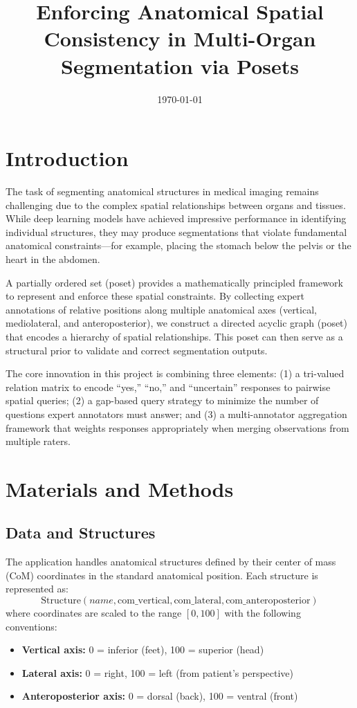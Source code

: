 \documentclass[12pt,a4paper]{article}
\title{Enforcing Anatomical Spatial Consistency in Multi-Organ Segmentation via Posets}
\author{}
\date{\today}
\begin{document}
\maketitle

\tableofcontents
\newpage

\section{Introduction}

The task of segmenting anatomical structures in medical imaging remains challenging due to the complex spatial relationships between organs and tissues. While deep learning models have achieved impressive performance in identifying individual structures, they may produce segmentations that violate fundamental anatomical constraints—for example, placing the stomach below the pelvis or the heart in the abdomen.

A partially ordered set (poset) provides a mathematically principled framework to represent and enforce these spatial constraints. By collecting expert annotations of relative positions along multiple anatomical axes (vertical, mediolateral, and anteroposterior), we construct a directed acyclic graph (poset) that encodes a hierarchy of spatial relationships. This poset can then serve as a structural prior to validate and correct segmentation outputs.

The core innovation in this project is combining three elements: (1) a tri-valued relation matrix to encode ``yes,'' ``no,'' and ``uncertain'' responses to pairwise spatial queries; (2) a gap-based query strategy to minimize the number of questions expert annotators must answer; and (3) a multi-annotator aggregation framework that weights responses appropriately when merging observations from multiple raters.

\section{Materials and Methods}

\subsection{Data and Structures}

The application handles anatomical structures defined by their center of mass (CoM) coordinates in the standard anatomical position. Each structure is represented as:
\[
\text{Structure}(name, \text{com\_vertical}, \text{com\_lateral}, \text{com\_anteroposterior})
\]
where coordinates are scaled to the range $[0, 100]$ with the following conventions:
\begin{itemize}
  \item \textbf{Vertical axis:} 0 = inferior (feet), 100 = superior (head)
  \item \textbf{Lateral axis:} 0 = right, 100 = left (from patient's perspective)
  \item \textbf{Anteroposterior axis:} 0 = dorsal (back), 100 = ventral (front)
\end{itemize}
\end{document}

